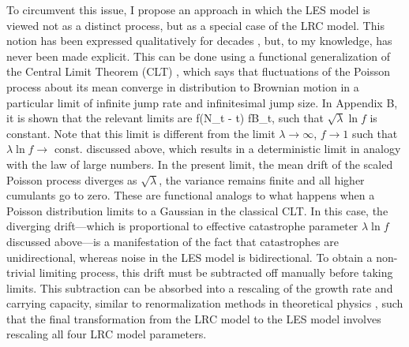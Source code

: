 To circumvent this issue, I propose an approach in which the LES model is viewed not as a distinct process, but as a special case of the LRC model.  This notion has been expressed qualitatively for decades \cite{shaffer1987minimum,lande1993risks}, but, to my knowledge, has never been made explicit.  This can be done using a functional generalization of the Central Limit Theorem (CLT) \cite{jacod2013limit}, which says that fluctuations of the Poisson process about its mean converge in distribution to Brownian motion in a particular limit of infinite jump rate and infinitesimal jump size.  In Appendix B, it is shown that the relevant limits are 
\be
\ln f(N_t - \lambda t)  \sqrt{\lambda} \ln fB_t,
\ee
\noindent such that $\sqrt{\lambda}\ln f$ is constant.  Note that this limit is different from the limit $\lambda\to\infty$, $f\to 1$ such that $\lambda\ln f \to $ const. discussed above, which results in a deterministic limit in analogy with the law of large numbers. In the present limit, the mean drift of the scaled Poisson process diverges as $\sqrt{\lambda}$, the variance remains finite and all higher cumulants go to zero.  These are functional analogs to what happens when a Poisson distribution limits to a Gaussian in the classical CLT.   In this case, the diverging drift---which is proportional to effective catastrophe parameter $\lambda\ln f$ discussed above---is a manifestation of the fact that catastrophes are unidirectional, whereas noise in the LES model is bidirectional.  To obtain a non-trivial limiting process, this drift must be subtracted off manually before taking limits.  This subtraction can be absorbed into a rescaling of the growth rate and carrying capacity, similar to renormalization methods in theoretical physics \cite{peskin1995quantum}, such that the final transformation from the LRC model to the LES model involves rescaling all four LRC model parameters.

